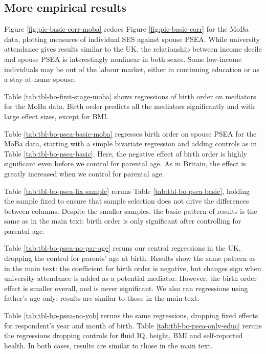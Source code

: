 \documentclass[
  12pt,
]{article}
\theoremstyle{definition}
\theoremstyle{definition}
\theoremstyle{definition}
\theoremstyle{definition}
\theoremstyle{remark}
\begin{document}
\FloatBarrier

\newpage

\subsection{More empirical results}\label{more-empirical-results}

Figure \ref{fig:pic-basic-corr-moba} redoes Figure
\ref{fig:pic-basic-corr} for the MoBa data, plotting measures of
individual SES against spouse PSEA. While university attendance gives
results similar to the UK, the relationship between income decile and
spouse PSEA is interestingly nonlinear in both sexes. Some low-income
individuals may be out of the labour market, either in continuing
education or as a stay-at-home spouse.

Table \ref{tab:tbl-bo-first-stage-moba} shows regressions of birth
order on mediators for the MoBa data. Birth order predicts all the
mediators significantly and with large effect sizes, except for BMI.

Table \ref{tab:tbl-bo-psea-basic-moba} regresses birth order on spouse
PSEA for the MoBa data, starting with a simple bivariate regression and
adding controls as in Table \ref{tab:tbl-bo-psea-basic}. Here, the
negative effect of birth order is highly significant even before we
control for parental age. As in Britain, the effect is greatly increased
when we control for parental age.

Table \ref{tab:tbl-bo-psea-fix-sample} reruns Table
\ref{tab:tbl-bo-psea-basic}, holding the sample fixed to ensure that
sample selection does not drive the differences between columns. Despite
the smaller samples, the basic pattern of results is the same as in the
main text: birth order is only significant after controlling for
parental age.

Table \ref{tab:tbl-bo-psea-no-par-age} reruns our central regressions
in the UK, dropping the control for parents' age at birth. Results show
the same pattern as in the main text: the coefficient for birth order is
negative, but changes sign when university attendance is added as a
potential mediator. However, the birth order effect is smaller overall,
and is never significant. We also ran regressions using father's age
only: results are similar to those in the main text.

Table \ref{tab:tbl-bo-psea-no-yob} reruns the same regressions,
dropping fixed effects for respondent's year and month of birth. Table
\ref{tab:tbl-bo-psea-only-educ} reruns the regressions dropping
controls for fluid IQ, height, BMI and self-reported health. In both
cases, results are similar to those in the main text.
\end{document}
